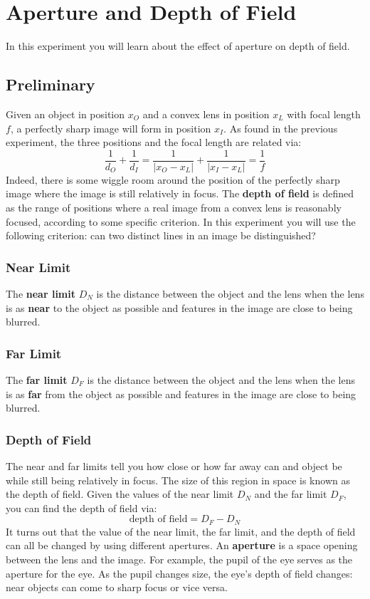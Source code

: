 \setcounter{chapter}{8}
\chapter{Aperture and Depth of Field}
%
In this experiment you will learn about the effect of aperture on depth of field.
%
\section{Preliminary}
%
Given an object in position $x_{O}$ and a convex lens in position $x_{L}$ with focal length $f$, a perfectly sharp image will form in position $x_{I}$. As found in the previous experiment, the three positions and the focal length are related via:
\begin{equation}
    \frac{1}{d_{O}} + \frac{1}{d_{I}} = \frac{1}{\vert x_{O} - x_{L} \vert} + \frac{1}{\vert x_{I} - x_{L} \vert} = \frac{1}{f}
\end{equation}
Indeed, there is some wiggle room around the position of the perfectly sharp image where the image is still relatively in focus. The \textbf{depth of field} is defined as the range of positions where a real image from a convex lens is reasonably focused, according to some specific criterion. In this experiment you will use the following criterion: can two distinct lines in an image be distinguished?
%
\subsection{Near Limit}
%
The \textbf{near limit} $D_{N}$ is the distance between the object and the lens when the lens is as \textbf{near} to the object as possible and features in the image are close to being blurred.
%
\subsection{Far Limit}
%
The \textbf{far limit} $D_{F}$ is the distance between the object and the lens when the lens is as \textbf{far} from the object as possible and features in the image are close to being blurred.
%
\subsection{Depth of Field}
%
The near and far limits tell you how close or how far away can and object be while still being relatively in focus. The size of this region in space is known as the depth of field. Given the values of the near limit $D_{N}$ and the far limit $D_{F}$, you can find the depth of field via:
\begin{equation}
    \text{depth of field} = D_{F} - D_{N}
    \label{eq.09.dof}
\end{equation}
It turns out that the value of the near limit, the far limit, and the depth of field can all be changed by using different apertures. An \textbf{aperture} is a space opening between the lens and the image. For example, the pupil of the eye serves as the aperture for the eye. As the pupil changes size, the eye's depth of field changes: near objects can come to sharp focus or vice versa.
%
